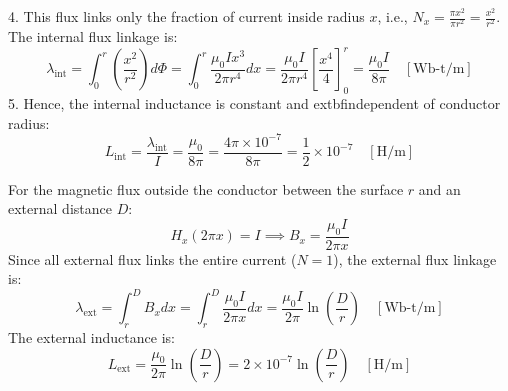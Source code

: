 \documentclass[11pt,a4paper]{article}
\newenvironment{Deriv}[1][Mathematical Derivation]{\begin{tcolorbox}[derivbox, title=#1]}{\end{tcolorbox}}
\begin{document}
\begin{Deriv}[Derivation of Internal Flux Linkage ($\lambda_{\text{int}}$)]
4. This flux links only the fraction of current inside radius $x$, i.e., $N_x = \frac{\pi x^2}{\pi r^2} = \frac{x^2}{r^2}$. The internal flux linkage is:
\begin{equation}
  \lambda_{\text{int}} = \int_{0}^{r} \left(\frac{x^2}{r^2}\right) d\Phi = \int_{0}^{r} \frac{\mu_0 I x^3}{2\pi r^4} dx = \frac{\mu_0 I}{2\pi r^4} \left[ \frac{x^4}{4} \right]_0^r = \frac{\mu_0 I}{8\pi} \quad [\text{Wb-t/m}]
\end{equation}
5. Hence, the internal inductance is constant and 	extbf{independent of conductor radius}:
\begin{equation}
  L_{\text{int}} = \frac{\lambda_{\text{int}}}{I} = \frac{\mu_0}{8\pi} = \frac{4\pi \times 10^{-7}}{8\pi} = \frac{1}{2} \times 10^{-7} \quad [\text{H/m}]
\end{equation}
\end{Deriv}

\begin{Deriv}[Derivation of External Flux Linkage ($\lambda_{\text{ext}}$)]
For the magnetic flux outside the conductor between the surface $r$ and an external distance $D$:
\begin{equation}
  H_x (2\pi x) = I \implies B_x = \frac{\mu_0 I}{2\pi x}
\end{equation}
Since all external flux links the entire current ($N=1$), the external flux linkage is:
\begin{equation}
  \lambda_{\text{ext}} = \int_{r}^{D} B_x dx = \int_{r}^{D} \frac{\mu_0 I}{2\pi x} dx = \frac{\mu_0 I}{2\pi} \ln\left(\frac{D}{r}\right) \quad [\text{Wb-t/m}]
\end{equation}
The external inductance is:
\begin{equation}
  L_{\text{ext}} = \frac{\mu_0}{2\pi} \ln\left(\frac{D}{r}\right) = 2 \times 10^{-7} \ln\left(\frac{D}{r}\right) \quad [\text{H/m}]
\end{equation}
\end{Deriv}
\end{document}
